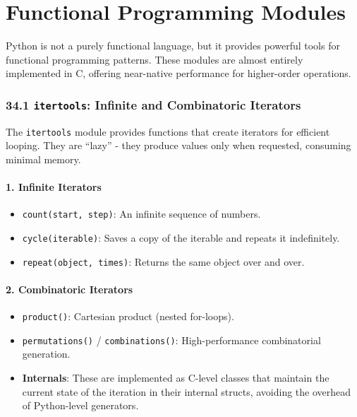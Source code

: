 \hypertarget{functional-programming-modules}{%
\chapter{Functional Programming
Modules}\label{functional-programming-modules}}

Python is not a purely functional language, but it provides powerful
tools for functional programming patterns. These modules are almost
entirely implemented in C, offering near-native performance for
higher-order operations.

\hypertarget{itertools-infinite-and-combinatoric-iterators}{%
\subsection{\texorpdfstring{34.1 \texttt{itertools}: Infinite and
Combinatoric
Iterators}{34.1 itertools: Infinite and Combinatoric Iterators}}\label{itertools-infinite-and-combinatoric-iterators}}

The \passthrough{\lstinline!itertools!} module provides functions that
create iterators for efficient looping. They are ``lazy'' - they produce
values only when requested, consuming minimal memory.

\hypertarget{infinite-iterators}{%
\subsubsection{1. Infinite Iterators}\label{infinite-iterators}}

\begin{itemize}
\tightlist
\item
  \passthrough{\lstinline!count(start, step)!}: An infinite sequence of
  numbers.
\item
  \passthrough{\lstinline!cycle(iterable)!}: Saves a copy of the
  iterable and repeats it indefinitely.
\item
  \passthrough{\lstinline!repeat(object, times)!}: Returns the same
  object over and over.
\end{itemize}

\hypertarget{combinatoric-iterators}{%
\subsubsection{2. Combinatoric Iterators}\label{combinatoric-iterators}}

\begin{itemize}
\tightlist
\item
  \passthrough{\lstinline!product()!}: Cartesian product (nested
  for-loops).
\item
  \passthrough{\lstinline!permutations()!} /
  \passthrough{\lstinline!combinations()!}: High-performance
  combinatorial generation.
\item
  \textbf{Internals}: These are implemented as C-level classes that
  maintain the current state of the iteration in their internal structs,
  avoiding the overhead of Python-level generators.
\end{itemize}


